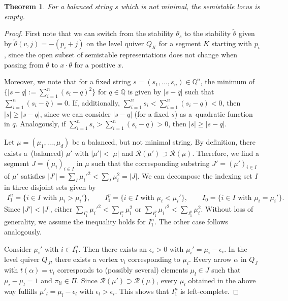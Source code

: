\documentclass[pdftex]{sigma}
\newcommand{\R}{\mathcal{R}}
\numberwithin{equation}{section}
\newtheorem{Theorem}{Theorem}[section]
\theoremstyle{definition}
\begin{document}
\begin{Theorem} \label{theo balanced semi-stable empty}
For a balanced string $s$ which is not minimal, the semistable locus  is empty.
\end{Theorem}

\begin{proof}
First note that we can switch from the stability $\theta_s$ to the stability $\tilde{\theta}$ given by $\tilde{\theta}(v,j) = -(p_i +j)$ on the level quiver $Q_K$ for a segment $K$ starting with $p_i$, since the open subset of semistable representations does not change when passing from $\theta$ to $x \cdot \theta$ for a positive $x$.

Moreover, we note that for a fixed string $s = (s_1, \dots, s_n) \in \mathbb{Q}^n$, the minimum of $\big\{|s-q| := \sum_{i=1}^n (s_i - q)^2 \big\}$ for $q \in \mathbb{Q}$ is given by $|s-\bar{q}|$ such that $\sum_{i=1}^n (s_i-\bar{q}) =0$. If, additionally, $\sum_{i=1}^n s_i < \sum_{i=1}^n (s_i-q) <0$, then $|s| \geq |s-q|$, since we can consider $|s-q|$ (for a fixed $s$) as a~quadratic function in $q$. Analogously, if $\sum_{i=1}^n s_i > \sum_{i=1}^n (s_i-q) >0$, then $|s| \geq |s-q|$.

Let $\mu = (\mu_1, \dots, \mu_d)$ be a balanced, but not minimal string. By definition, there exists a~(balanced) $\mu'$ with $|\mu'| < |\mu|$ and $\R(\mu') \supset \R(\mu)$. Therefore, we find a segment $J= (\mu_i)_{i \in I}$ in $\mu$ such that the corresponding substring $J' = (\mu')_{i \in I}$ of $\mu'$ satisfies $|J'|= \sum_I \mu_i'^2 < \sum_I \mu_i^2=|J|$.
We can decompose the indexing set $I$ in three disjoint sets given by
\begin{align*}
I^n_1 = \{ i \in I \text{ with } \mu_i > \mu_i' \} ,\qquad
I^p_1 = \{ i \in I \text{ with } \mu_i <\mu_i' \}, \qquad
I_0 = \{ i \in I \text{ with } \mu_i = \mu_i' \} .
\end{align*}
Since $|J'| < |J|$, either $\sum_{I^n_1} \mu_i'^2 < \sum_{I^n_1} \mu_i^2$ or $\sum_{I^p_1} \mu_i'^2 < \sum_{I^p_1} \mu_i^2$. Without loss of generality, we assume the inequality holds for $I^n_1$. The other case follows analogously.

Consider $\mu_i'$ with $i \in I^n_1$. Then there exists an $\epsilon_i >0$ with $\mu_i' = \mu_i - \epsilon_i$. In the level quiver $Q_J$, there exists a vertex $v_i$ corresponding to $\mu_i$. Every arrow $\alpha$ in $Q_J$ with $t(\alpha)= v_i$ corresponds to (possibly several) elements $\mu_l \in J$ such that $\mu_i - \mu_l = 1$ and $\pi_{li} \in \Pi$. Since $\R(\mu') \supset \R(\mu)$, every $\mu_l$ obtained in the above way fulfills $\mu'_l = \mu_l - \epsilon_l$ with $\epsilon_l > \epsilon_i$. This shows that $I^n_1$ is left-complete.


\end{proof}
\end{document}
